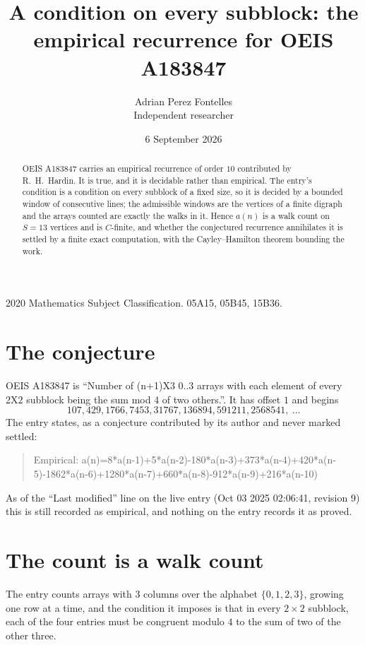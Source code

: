 \documentclass[11pt,a4paper]{article}
\title{A condition on every subblock: the empirical recurrence for OEIS A183847}
\author{Adrian Perez Fontelles\\ \small Independent researcher}
\date{6 September 2026}
\theoremstyle{plain}
\theoremstyle{definition}
\begin{document}
\maketitle

\begin{abstract}
OEIS A183847 carries an empirical recurrence of order $10$ contributed by R.~H.~Hardin. It is
true, and it is decidable rather than empirical. The entry's condition is a condition on every
subblock of a fixed size, so it is decided by a bounded window of consecutive lines; the
admissible windows are the vertices of a finite digraph and the arrays counted are exactly the
walks in it. Hence $a(n)$ is a walk count on $S=13$ vertices and is $C$-finite, and whether the
conjectured recurrence annihilates it is settled by a finite exact computation, with the
Cayley--Hamilton theorem bounding the work.
\end{abstract}

\noindent\small 2020 Mathematics Subject Classification. 05A15, 05B45, 15B36.\normalsize

\section{The conjecture}

OEIS A183847 is ``Number of (n+1)X3 0..3 arrays with each element of every 2X2 subblock being the sum mod 4 of two others.''. It has offset $1$ and begins
\[
107, 429, 1766, 7453, 31767, 136894, 591211, 2568541,\ \dots
\]
The entry states, as a conjecture contributed by its author and never marked settled:
\begin{quote}
Empirical: a(n)=8*a(n-1)+5*a(n-2)-180*a(n-3)+373*a(n-4)+420*a(n-5)-1862*a(n-6)+1280*a(n-7)+660*a(n-8)-912*a(n-9)+216*a(n-10)
\end{quote}
As of the ``Last modified'' line on the live entry (Oct 03 2025 02:06:41, revision 9) this is still
recorded as empirical, and nothing on the entry records it as proved.

\section{The count is a walk count}

The entry counts arrays with $3$ columns over the alphabet $\{0,1,2,3\}$, growing one row at a time, and the condition it imposes is that in every $2\times2$ subblock, each of the four entries must be congruent modulo $4$ to the sum of two of the other three.
\end{document}
